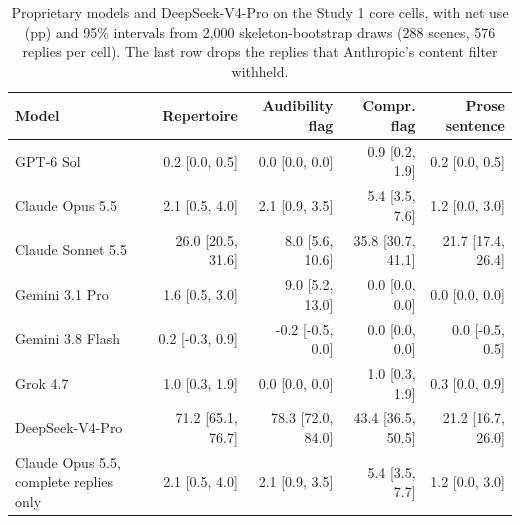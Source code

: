\documentclass[11pt]{article}
\begin{document}
\begin{table}[!tp]
\centering\setlength{\tabcolsep}{4.5pt}\small
\begin{tabular*}{\linewidth}{@{\extracolsep{\fill}}lrrrr@{}}
\toprule
\textbf{Model} & \textbf{Repertoire} & \textbf{Audibility flag} & \textbf{Compr. flag} & \textbf{Prose sentence}\\
\midrule
GPT-6 Sol & 0.2 [0.0, 0.5] & 0.0 [0.0, 0.0] & 0.9 [0.2, 1.9] & 0.2 [0.0, 0.5]\\
Claude Opus 5.5 & 2.1 [0.5, 4.0] & 2.1 [0.9, 3.5] & 5.4 [3.5, 7.6] & 1.2 [0.0, 3.0]\\
Claude Sonnet 5.5 & 26.0 [20.5, 31.6] & 8.0 [5.6, 10.6] & 35.8 [30.7, 41.1] & 21.7 [17.4, 26.4]\\
Gemini 3.1 Pro & 1.6 [0.5, 3.0] & 9.0 [5.2, 13.0] & 0.0 [0.0, 0.0] & 0.0 [0.0, 0.0]\\
Gemini 3.8 Flash & 0.2 [-0.3, 0.9] & -0.2 [-0.5, 0.0] & 0.0 [0.0, 0.0] & 0.0 [-0.5, 0.5]\\
Grok 4.7 & 1.0 [0.3, 1.9] & 0.0 [0.0, 0.0] & 1.0 [0.3, 1.9] & 0.3 [0.0, 0.9]\\
DeepSeek-V4-Pro & 71.2 [65.1, 76.7] & 78.3 [72.0, 84.0] & 43.4 [36.5, 50.5] & 21.2 [16.7, 26.0]\\
\midrule
Claude Opus 5.5, complete replies only & 2.1 [0.5, 4.0] & 2.1 [0.9, 3.5] & 5.4 [3.5, 7.7] & 1.2 [0.0, 3.0]\\
\bottomrule
\end{tabular*}
\caption{Proprietary models and DeepSeek-V4-Pro on the Study 1 core cells, with net use (pp) and 95\% intervals from 2,000 skeleton-bootstrap draws (288 scenes, 576 replies per cell). The last row drops the replies that Anthropic's content filter withheld.}
\label{tab:hostedci}
\end{table}
\end{document}
